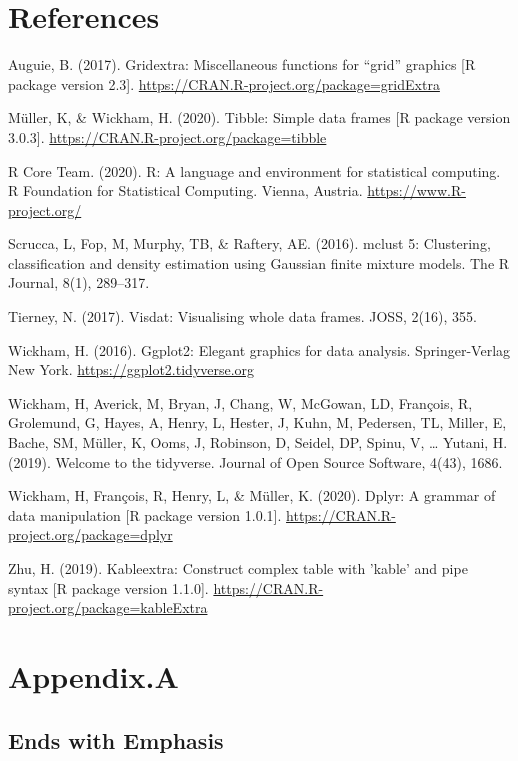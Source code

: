 \documentclass[11pt,a4paper,]{article}
\begin{document}
\clearpage

\hypertarget{references}{%
\section{References}\label{references}}

Auguie, B. (2017). Gridextra: Miscellaneous functions for ``grid'' graphics {[}R package version 2.3{]}.
\url{https://CRAN.R-project.org/package=gridExtra}

Müller, K, \& Wickham, H. (2020). Tibble: Simple data frames {[}R package version 3.0.3{]}. \url{https://CRAN.R-project.org/package=tibble}

R Core Team. (2020). R: A language and environment for statistical computing. R Foundation for Statistical Computing. Vienna, Austria. \url{https://www.R-project.org/}

Scrucca, L, Fop, M, Murphy, TB, \& Raftery, AE. (2016). mclust 5: Clustering, classification and density
estimation using Gaussian finite mixture models. The R Journal, 8(1), 289--317.

Tierney, N. (2017). Visdat: Visualising whole data frames. JOSS, 2(16), 355.

Wickham, H. (2016). Ggplot2: Elegant graphics for data analysis. Springer-Verlag New York. \url{https://ggplot2.tidyverse.org}

Wickham, H, Averick, M, Bryan, J, Chang, W, McGowan, LD, François, R, Grolemund, G, Hayes, A,
Henry, L, Hester, J, Kuhn, M, Pedersen, TL, Miller, E, Bache, SM, Müller, K, Ooms, J, Robinson,
D, Seidel, DP, Spinu, V, \ldots{} Yutani, H. (2019). Welcome to the tidyverse. Journal of Open
Source Software, 4(43), 1686.

Wickham, H, François, R, Henry, L, \& Müller, K. (2020). Dplyr: A grammar of data manipulation {[}R
package version 1.0.1{]}. \url{https://CRAN.R-project.org/package=dplyr}

Zhu, H. (2019). Kableextra: Construct complex table with 'kable' and pipe syntax {[}R package version
1.1.0{]}. \url{https://CRAN.R-project.org/package=kableExtra}

\clearpage

\appendix

\hypertarget{appendix.a}{%
\section{Appendix.A}\label{appendix.a}}

\hypertarget{ends-with-emphasis}{%
\subsection{Ends with Emphasis}\label{ends-with-emphasis}}
\end{document}
